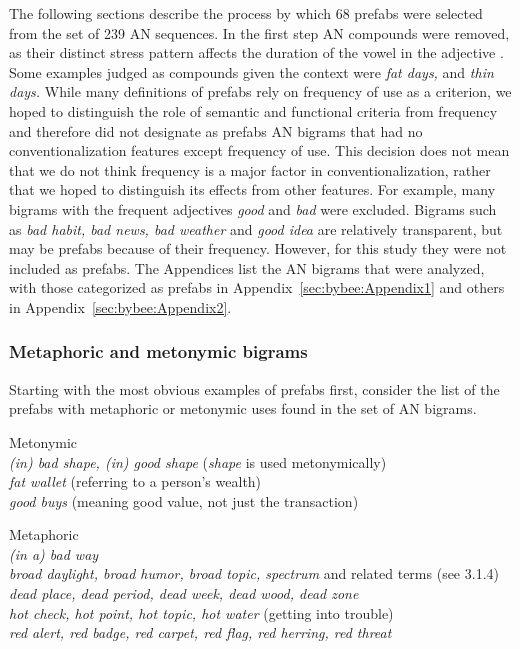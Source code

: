 \documentclass[output=paper]{langscibook}
\begin{document}
The following sections describe the process by which  68 prefabs were selected from the set of 239 AN sequences. In the first step AN compounds were removed, as their distinct stress pattern affects the duration of the vowel in the adjective \citep{Morrill2011}. Some examples judged as compounds given the context were \textit{fat days,} and \textit{thin days.} While many definitions of prefabs rely on frequency of use as a criterion, we hoped to distinguish the role of semantic and functional criteria from frequency and therefore did not designate as prefabs AN bigrams that had no conventionalization features except frequency of use. This decision does not mean that we do not think frequency is a major factor in conventionalization, rather that we hoped to distinguish its effects from other features. For example, many bigrams with the frequent adjectives \textit{good} and \textit{bad} were excluded. Bigrams such as \textit{bad habit, bad news, bad weather} and \textit{good idea} are relatively transparent, but may be prefabs because of their frequency. However, for this study they were not included as prefabs. The Appendices list the AN bigrams that were analyzed, with those categorized as prefabs in Appendix~\ref{sec:bybee:Appendix1} and others in Appendix~\ref{sec:bybee:Appendix2}. 

\subsubsection{Metaphoric and metonymic bigrams}\label{sec:bybee:3.1.2}

Starting with the most obvious examples of prefabs first, consider the list of the prefabs with metaphoric or metonymic uses found in the set of AN bigrams.

\ea\label{ex:bybee:3}Metonymic\\
\textit{(in) bad shape, (in) good shape} (\textit{shape} is used metonymically)\\
\textit{fat wallet} (referring to a person’s wealth)\\
\textit{good buys} (meaning good value, not just the transaction)

\ex \label{ex:bybee:4}Metaphoric\\
\textit{(in a) bad way}\\
\textit{broad daylight, broad humor, broad topic, spectrum} and related terms (see 3.1.4)\\
\textit{dead place, dead period, dead week, dead wood, dead zone}\\
\textit{hot check, hot point, hot topic, hot water} (getting into trouble)\\
\textit{red alert, red badge, red carpet, red flag, red herring, red threat}
\z
\end{document}
